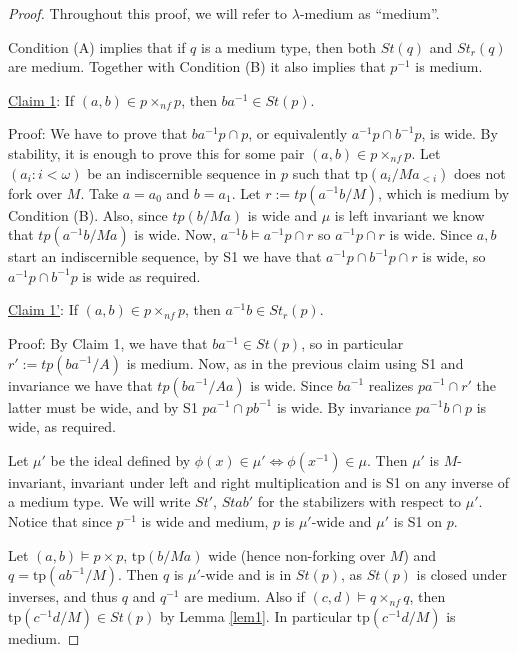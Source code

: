 \documentclass[12pt]{article}
\theoremstyle{definition}
\theoremstyle{mystyle}
\theoremstyle{remark}
\newcommand{\tp}{\mathrm{tp}}
\newcommand{\nf}{\times_{nf}}
\begin{document}
\begin{proof}
Throughout this proof, we will refer to $\lambda$-medium as
``medium''.

Condition (A) implies that if $q$ is a medium type, then both
$St(q)$ and $St_r(q)$ are medium. Together with Condition (B)
it also implies that $p^{-1}$ is medium.

\medskip
\noindent \underline{Claim 1}: If $(a,b)\in p \nf p$, then $ba^{-1}\in St(p)$.

\noindent Proof: We have to prove that $ba^{-1}p\cap p$, or equivalently $a^{-1}p\cap b^{-1}p$, is wide.
By stability, it is enough to prove this for some pair $(a,b)\in p\nf p$.
Let $(a_i:i<\omega)$ be an indiscernible sequence in $p$ such that $\tp(a_i/Ma_{<i})$
does not fork over $M$. Take $a=a_0$ and $b=a_1$.
Let $r:=tp(a^{-1}b/M)$, which is medium by
Condition (B). Also, since $tp(b/Ma)$ is wide and $\mu$ is left
invariant we know that $tp(a^{-1}b/Ma)$ is wide. Now,
$a^{-1}b\models a^{-1}p\cap r$ so $a^{-1}p\cap r$ is wide. Since
$a,b$ start an  indiscernible sequence, by S1 we have that
$a^{-1}p\cap b^{-1}p\cap r$ is wide, so $a^{-1}p\cap b^{-1}p$ is
wide as required.

\medskip
\noindent \underline{Claim 1'}: If $(a,b)\in p \nf p$, then $a^{-1}b\in St_r(p)$.

\noindent Proof: By Claim 1, we have that $ba^{-1} \in St(p)$, so
in particular $r':=tp(ba^{-1}/A)$ is medium. Now, as in the
previous claim using S1 and invariance we have that
$tp(ba^{-1}/Aa)$ is wide. Since $ba^{-1}$ realizes $pa^{-1}\cap
r'$ the latter must be wide, and by S1 $pa^{-1}\cap pb^{-1}$ is
wide. By invariance $pa^{-1}b\cap p$ is wide, as required.


\medskip
Let $\mu'$ be the ideal defined by $\phi(x)\in \mu' \iff
\phi(x^{-1})\in \mu$. Then $\mu'$ is $M$-invariant, invariant
under left and right multiplication and is S1 on any inverse of a
medium type. We will write $St'$, $Stab'$ for the stabilizers with
respect to $\mu'$. Notice that since $p^{-1}$ is wide and medium,
$p$ is $\mu'$-wide and $\mu'$ is S1 on $p$.

Let $(a,b)\models p\times p$, $\tp(b/Ma)$ wide (hence non-forking
over $M$) and $q=\tp(ab^{-1}/M)$. Then $q$ is $\mu'$-wide and is
in $St(p)$, as $St(p)$ is closed under inverses, and thus $q$ and
$q^{-1}$ are medium. Also if $(c,d)\models q\nf q$, then
$\tp(c^{-1} d/M) \in St(p)$ by Lemma \ref{lem1}. In particular
$\tp(c^{-1}d/M)$ is medium.


\end{proof}
\end{document}
